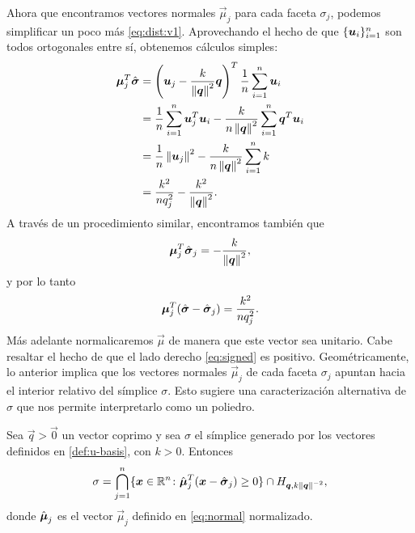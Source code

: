 Ahora que encontramos vectores normales $\vec{\mu}_j$ para cada faceta $\sigma_j$, podemos
simplificar un poco más \eqref{eq:dist:v1}. Aprovechando el hecho de que
$\lbrace \boldsymbol{u}_i \rbrace_{i=1}^{n}$ son todos ortogonales entre sí, obtenemos cálculos simples:
\begin{align*}
	\boldsymbol{\mu}_j^T\hat{\boldsymbol{ \sigma }}
	&=
	\left(\boldsymbol{u}_j - \frac{k}{\left\lVert \boldsymbol{q} \right\rVert^2}\boldsymbol{q}\right)^T \frac{1}{n}\sum_{i=1}^{n}\boldsymbol{u}_i \\
	&=
	\frac{1}{n}\sum_{i=1}^{n}\boldsymbol{u}_j^T\boldsymbol{u}_i - \frac{k}{n\left\lVert \boldsymbol{q} \right\rVert^2}
	\sum_{i=1}^{n}\boldsymbol{q}^T\boldsymbol{u}_i \\
	&= \frac{1}{n}\left\lVert \boldsymbol{u}_j \right\rVert^2 - \frac{k}{n\left\lVert \boldsymbol{q} \right\rVert^2}\sum_{i=1}^{n}k \\
	&= \frac{k^2}{nq_j^2} - \frac{k^2}{\left\lVert \boldsymbol{q} \right\rVert^2}.
\end{align*}
A través de un procedimiento similar, encontramos también que
\begin{equation}
	\label{eq:facetaux}
	\boldsymbol{\mu}_j^T\hat{\boldsymbol{ \sigma }}_j = -\frac{k}{\left\lVert \boldsymbol{q} \right\rVert^2},
\end{equation}
y por lo tanto
\begin{equation}
	\label{eq:signed}
	\boldsymbol{\mu}_j^T(\hat{\boldsymbol{ \sigma }} - \hat{\boldsymbol{ \sigma }}_j) = \frac{k^2}{nq_j^2}.
\end{equation}
Más adelante normalicaremos $\vec{\mu}$ de manera que este vector sea unitario. Cabe resaltar el
hecho de que el lado derecho \eqref{eq:signed} es positivo. Geométricamente, lo anterior implica
que los vectores normales $\vec{\mu}_j$ de cada faceta $\sigma_j$ apuntan hacia el interior relativo
del símplice $\sigma$. Esto sugiere una caracterización alternativa de $\sigma$ que nos permite
interpretarlo como un poliedro.
\begin{lemma}
	\label{lemma:sigmachar2}
	Sea $\vec{q} > \vec{0}$ un vector coprimo y sea $\sigma$ el símplice generado por los vectores
	definidos en \eqref{def:u-basis}, con $k > 0$. Entonces
	\begin{equation}
		\label{eq:sigmachar2}
		\sigma = \bigcap_{j=1}^{n}
		\lbrace \boldsymbol{x} \in \mathbb{R}^n \colon \hat{\boldsymbol{\mu}}_j^T(\boldsymbol{x} - \hat{\boldsymbol{ \sigma }}_j) \geq 0 \rbrace
		\cap H_{\boldsymbol{q}, k\left\lVert \boldsymbol{q} \right\rVert^{-2}},
	\end{equation}
	donde $\hat{\boldsymbol{\mu}}_j$ es el vector $\vec{\mu}_j$ definido en \eqref{eq:normal} normalizado.
\end{lemma}
